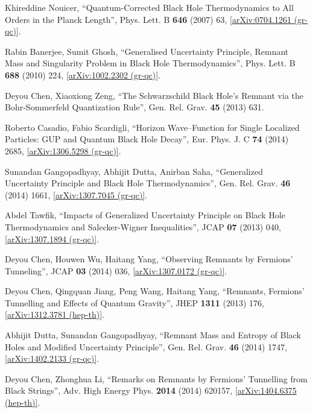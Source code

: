\documentclass[12pt]{article}
\newcommand{\2}{$^2$}
\newcommand{\3}{$^3$}
\newcommand{\4}{$_4$}
\newcommand{\5}{$_5$}
\begin{document}
\begin{thebibliography}{400}
Khireddine Nouicer, ``Quantum-Corrected Black Hole Thermodynamics to All Orders in the Planck Length'',  	Phys. Lett. B \textbf{646} (2007) 63, \href{http://arxiv.org/abs/0704.1261}{[arXiv:0704.1261 (gr-qc)]}.

Rabin Banerjee, Sumit Ghosh, ``Generalised Uncertainty Principle, Remnant Mass and Singularity Problem in Black Hole Thermodynamics'',  	Phys. Lett. B \textbf{688} (2010) 224, \href{http://arxiv.org/abs/1002.2302}{[arXiv:1002.2302 (gr-qc)]}.

 Deyou Chen, Xiaoxiong Zeng, ``The Schwarzschild Black Hole's Remnant via the Bohr-Sommerfeld Quantization Rule'', Gen. Rel. Grav. \textbf{45} (2013) 631.

Roberto Casadio, Fabio Scardigli, ``Horizon Wave--Function for Single Localized Particles: GUP and Quantum Black Hole Decay'', Eur. Phys. J. C \textbf{74} (2014) 2685, \href{http://arxiv.org/abs/1306.5298}{[arXiv:1306.5298 (gr-qc)]}.
 
Sunandan Gangopadhyay, Abhijit Dutta, Anirban Saha, ``Generalized Uncertainty Principle and Black Hole Thermodynamics'',  	Gen. Rel. Grav. \textbf{46} (2014) 1661, \href{http://arxiv.org/abs/1307.7045}{[arXiv:1307.7045 (gr-qc)]}.

Abdel Tawfik, ``Impacts of Generalized Uncertainty Principle on Black Hole Thermodynamics and Salecker-Wigner Inequalities'', JCAP \textbf{07} (2013) 040, \href{http://arxiv.org/abs/1307.1894}{[arXiv:1307.1894 (gr-qc)]}.



Deyou Chen, Houwen Wu, Haitang Yang, ``Observing Remnants by Fermions' Tunneling'',  JCAP \textbf{03} (2014) 036, \href{http://arxiv.org/abs/1307.0172}{[arXiv:1307.0172 (gr-qc)]}.

Deyou Chen, Qingquan Jiang, Peng Wang, Haitang Yang, ``Remnants, Fermions' Tunnelling and Effects of Quantum Gravity'',  	JHEP \textbf{1311} (2013) 176, \href{http://arxiv.org/abs/1312.3781}{[arXiv:1312.3781 (hep-th)]}. 

Abhijit Dutta, Sunandan Gangopadhyay, ``Remnant Mass and Entropy of Black Holes and Modified Uncertainty Principle'', Gen. Rel. Grav. \textbf{46} (2014)  1747, \href{http://arxiv.org/abs/1402.2133}{[arXiv:1402.2133 (gr-qc)]}.

Deyou Chen, Zhonghua Li, ``Remarks on Remnants by Fermions' Tunnelling from Black Strings'', Adv. High Energy Phys. \textbf{2014} (2014) 620157, \href{http://arxiv.org/abs/1404.6375}{[arXiv:1404.6375 (hep-th)]}.


\end{thebibliography}
\end{document}
